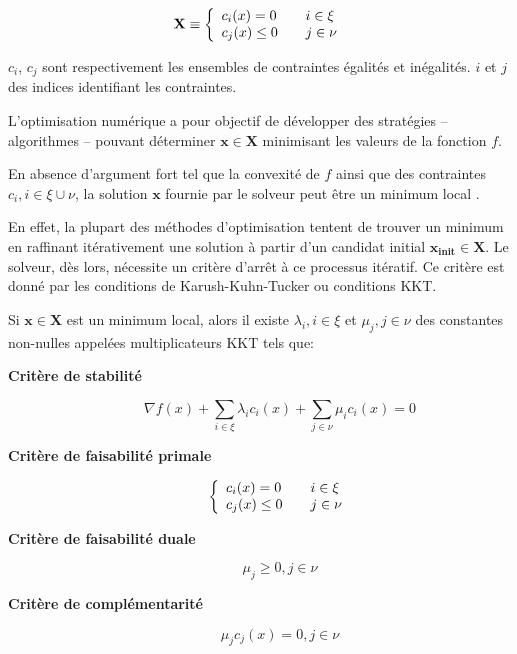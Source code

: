\begin{equation}
  \mathbf{X} \equiv \left\{
  \begin{array}{l l}
    c_i (x) = 0    & \quad i \in \xi \\
    c_j (x) \leq 0 & \quad j \in \nu \\
  \end{array} \right.
\end{equation}

$c_i$, $c_j$ sont respectivement les ensembles de contraintes égalités
et inégalités. $i$ et $j$ des indices identifiant les contraintes.


L'optimisation numérique a pour objectif de développer des stratégies
-- algorithmes -- pouvant déterminer $\mathbf{x} \in \mathbf{X}$
minimisant les valeurs de la fonction $f$.


En absence d'argument fort tel que la convexité de $f$ ainsi que des
contraintes $c_i, i \in \xi \cup \nu$, la solution $\mathbf{x}$
fournie par le solveur peut être un minimum local .


En effet, la plupart des méthodes d'optimisation tentent de trouver un
minimum en raffinant itérativement une solution à partir d'un candidat
initial $\mathbf{x_{\text{init}}} \in \mathbf{X}$. Le solveur, dès
lors, nécessite un critère d'arrêt à ce processus itératif. Ce critère
est donné par les conditions de Karush-Kuhn-Tucker  ou conditions KKT.

\begin{mydef}\label{def:chap1_kkt}
Si $\mathbf{x} \in \mathbf{X}$ est un minimum local, alors il existe
$\lambda_i, i \in \xi$ et $\mu_j, j \in \nu$ des constantes non-nulles
appelées multiplicateurs KKT tels que:
%
\begin{description}
\item[\textbf{Critère de stabilité}] \begin{equation}
  \nabla f(x) + \sum_{i \in \xi} \lambda_i c_i(x) + \sum_{j \in \nu} \mu_i c_i(x) = 0
\end{equation}
\item[\textbf{Critère de faisabilité primale}] \begin{equation}
\left\{
\begin{array}{l l}
  c_i (x) = 0    & \quad i \in \xi \\
  c_j (x) \leq 0 & \quad j \in \nu \\
\end{array} \right.
\end{equation}
\item[\textbf{Critère de faisabilité duale}] \begin{equation}
\mu_j \geq 0, j \in \nu
\end{equation}
\item[\textbf{Critère de complémentarité}] \begin{equation}
\mu_j c_j(x) = 0, j \in \nu
\end{equation}
\end{description}
\end{mydef}

